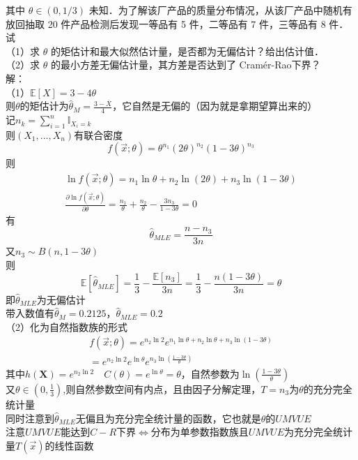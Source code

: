 \documentclass[UTF8,openany]{book}
\begin{document}
	其中 $\theta \in(0,1 / 3)$ 未知．为了解该厂产品的质量分布情况，从该厂产品中随机有放回抽取 20 件产品检测后发现一等品有 5 件，二等品有 7 件，三等品有 8 件．试\\
	（1）求 $\theta$ 的矩估计和最大似然估计量，是否都为无偏估计？给出估计值．\\
	（2）求 $\theta$ 的最小方差无偏估计量，其方差是否达到了 Cramér-Rao下界？\\
	解：\\
	（1）$\mathbb{E}[X]=3-4\theta$\\
	则$\theta$的矩估计为$\hat{\theta}_{M}=\frac{3-\overline{X}}{4}$，它自然是无偏的（因为就是拿期望算出来的）\\
	记$n_k=\sum_{i=1}^{n} \mathbb{I}_{X_i=k}$\\
	则$(X_1,...,X_n)$有联合密度$$f(\vec{x};\theta)=\theta^{n_1}(2\theta)^{n_2}(1-3\theta)^{n_3}$$
	则\\
	\begin{gather}
		\ln f(\vec{x};\theta)=n_1 \ln \theta+n_2\ln (2\theta) +n_3\ln(1-3\theta)\\
		\frac{\partial \ln f\left(\vec{x} ; \theta\right)}{\partial \theta}=\frac{n_1}{\theta}+\frac{n_2}{\theta}-\frac{3n_3}{1-3\theta}=0
	\end{gather}
	有$$\hat{\theta}_{MLE}=\frac{n-n_3}{3n}$$
	又$n_3 \sim B(n,1-3\theta)$\\
	则$$\mathbb{E}[\hat{\theta}_{MLE}]=\frac{1}{3}-\frac{\mathbb{E}[n_3]}{3n}=\frac{1}{3}-\frac{n(1-3\theta)}{3n}=\theta$$
	即$\hat{\theta}_{MLE}$为无偏估计\\
	带入数值有$\hat{\theta}_{M}=0.2125$，$\hat{\theta}_{MLE}=0.2$\\
	（2）化为自然指数族的形式\\
	\begin{gather}
		f(\vec{x};\theta)=e^{n_2\ln2}e^{n_1\ln\theta+n_2\ln\theta+n_3\ln(1-3\theta)}\\
		=e^{n_2\ln2}e^{\ln\theta}e^{n_3\ln(\frac{1-3\theta}{\theta})}
	\end{gather}
	其中$h(\boldsymbol{X})=e^{n_2\ln2} \quad C(\theta)=e^{\ln\theta}=\theta$，自然参数为$\ln(\frac{1-3\theta}{\theta})$\\
	又$\theta \in (0,\frac{1}{3})$,则自然参数空间有内点，且由因子分解定理，$T=n_3$为$\theta$的充分完全统计量\\
	同时注意到$\hat{\theta}_{MLE}$无偏且为充分完全统计量的函数，它也就是$\theta$的$UMVUE$\\
	注意$UMVUE$能达到$C-R$下界$\iff$分布为单参数指数族且$UMVUE$为充分完全统计量$T(\vec{x})$的线性函数\\
\end{document}
